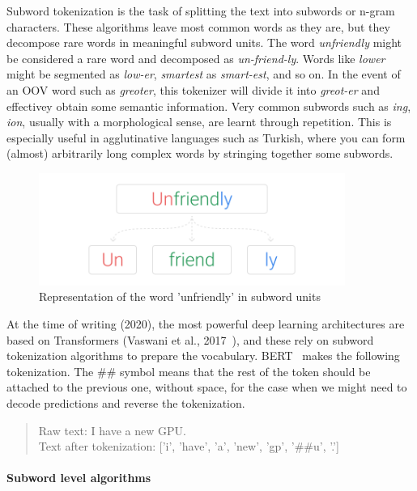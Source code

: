 Subword tokenization is the task of splitting the text into subwords or n-gram characters. These algorithms leave most common words as they are, but they decompose rare words in meaningful subword units. The word \emph{unfriendly} might be considered a rare word and decomposed as \emph{un-friend-ly}. Words like \emph{lower} might be segmented as \emph{low-er}, \emph{smartest} as \emph{smart-est}, and so on. In the event of an OOV word such as \emph{greoter}, this tokenizer will divide it into \emph{greot-er} and effectivey obtain some semantic information. Very common subwords such as \emph{ing}, \emph{ion}, usually with a morphological sense, are learnt through repetition. This is especially useful in agglutinative languages such as Turkish, where you can form (almost) arbitrarily long complex words by stringing together some subwords.

\begin{figure}[!ht]
    \centering
    \includegraphics[width=10cm]{figures/subword.png}
    \caption{Representation of the word 'unfriendly' in subword units}
\end{figure}

At the time of writing (2020), the most powerful deep learning architectures are based on Transformers (Vaswani et al., 2017~\cite{vaswani2017attention}), and these rely on subword tokenization algorithms to prepare the vocabulary. BERT~\cite{devlin2018bert} makes the following tokenization. The \#\# symbol means that the rest of the token should be attached to the previous one, without space, for the case when we might need to decode predictions and reverse the tokenization.

\begin{quote}
    Raw text: I have a new GPU.\\
    Text after tokenization: ['i', 'have', 'a', 'new', 'gp', '\#\#u', '.']
\end{quote}

\paragraph{Subword level algorithms}

